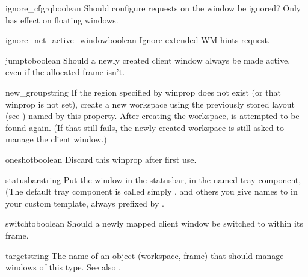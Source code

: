 \begin{winprop}{ignore_cfgrq}{boolean}
    Should configure requests on the window be ignored?
    Only has effect on floating windows.
\end{winprop}


\begin{winprop}{ignore_net_active_window}{boolean}
    Ignore extended WM hints  request. 
\end{winprop}


\begin{winprop}{jumpto}{boolean}
    Should a newly created client window always be made
    active, even if the allocated frame isn't. 
\end{winprop}


\begin{winprop}{new_group}{string}
    If the region specified by  winprop does not exist
    (or that winprop is not set), create a new workspace using the 
    previously stored layout (see ) named by
    this property. After creating the workspace,  is 
    attempted to be found again. (If that still fails, the newly 
    created workspace is still asked to manage the client window.)
\end{winprop}


\begin{winprop}{oneshot}{boolean}
    Discard this winprop after first use. 
\end{winprop}


\begin{winprop}{statusbar}{string}
    Put the window in the statusbar, in the named tray component,
    (The default tray component is called simply , 
    and others you give names to in your custom template, always 
    prefixed by .
\end{winprop}


\begin{winprop}{switchto}{boolean}
    Should a newly mapped client window be switched to within
    its frame.
\end{winprop}
        

\begin{winprop}{target}{string}
    The name of an object (workspace, frame) that should manage 
    windows of this type. See also .
\end{winprop}

